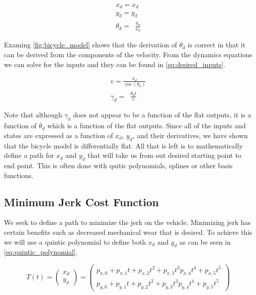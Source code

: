 \documentclass{article}
\DeclareMathOperator{\taninv}{\tan^{-1}}
\begin{document}
\begin{equation}
  \begin{aligned}
    x_d = x_d \\
    y_d = y_d \\
    \theta_d = \taninv{\frac{\dot{y_d}}{\dot{x_d}}}
  \end{aligned}
  \label{eq:desired_states}
\end{equation}

Examing \cref{fig:bicycle_model} shows that the derivation of $\theta_d$ is correct in that
it can be derived from the components of the velocity. From the dynamics equations we can solve for the inputs and they can 
be found in \cref{eq:desired_inputs}.

\begin{equation}
  \begin{aligned}
    v = \frac{x_d}{\cos(\theta_d)} \\
    \gamma_d = \taninv{\frac{\dot{\theta}_d l}{v}}
  \end{aligned}
  \label{eq:desired_inputs}
\end{equation}

Note that although $\gamma_d$ does not appear to be a function of the flat outputs, it is a function
of $\dot{\theta_d}$ which is a function of the flat outputs. Since all of the inputs and states are expressed as a function of $x_d$, $y_d$, and 
their derivatives, we have shown that the bicycle model is differentially flat. All that is 
left is to mathematically define a path for $x_d$ and $y_d$ that will take us from out desired 
starting point to end point. This is often done with quitic polynomials, splines or other basis functions.

\subsection{Minimum Jerk Cost Function}

We seek to define a path to minimize the jerk on the vehicle. Minimizing jerk has 
certain benefits such as decreased mechanical wear that is desired. To achieve this
we will use a quintic polynomial to define both $x_d$ and $y_d$ as can be seen in \cref{eq:quintic_polynomial}.

\begin{equation}
  T(t) =\begin{pmatrix}
x_d\\y_d 

\end{pmatrix} = \begin{pmatrix}
p_{x,0} + p_{x,1}t + p_{x,2}t^2 + p_{x,3}t^3 p_{x,4}t^4 + p_{x,5}t^5\\

p_{y,0} + p_{y,1}t + p_{y,2}t^2 + p_{y,3}t^3 p_{y,4}t^4 + p_{y,5}t^5 

\end{pmatrix}
\label{eq:quintic_polynomial}
\end{equation}
\end{document}
